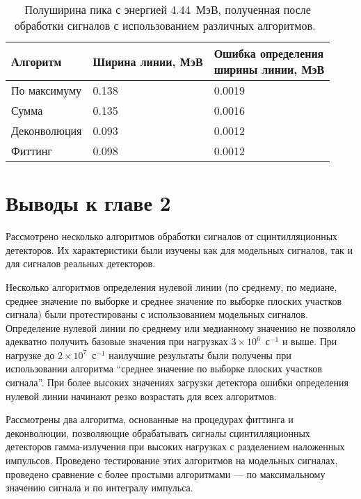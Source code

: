 \begin{table} [htbp]
    \centering
    \begin{threeparttable}
      \caption{ Полуширина пика с энергией 4.44~МэВ, полученная после обработки сигналов с использованием различных алгоритмов.~\cite{Khilkevitch2020} }
        \label{tab:processingCycloSignal}
        \begin{tabular}{| p{4cm} | p{5.5cm} | p{5.5cm} | }
            \hline
            Алгоритм   & Ширина линии, МэВ & \makecell{ Ошибка определения \\ ширины линии, МэВ } \\
            \hline
            По максимуму & 0.138 & 0.0019 \\
            Сумма &	0.135 &	0.0016\\
          Деконволюция &	0.093 &	0.0012 \\
          Фиттинг &	0.098 &	0.0012 \\
            \hline
        \end{tabular}
    \end{threeparttable}
\end{table}


\FloatBarrier
\section{Выводы к главе 2}

Рассмотрено несколько алгоритмов обработки сигналов от сцинтилляционных детекторов. Их характеристики были изучены как для модельных сигналов, так и для сигналов реальных детекторов.

Несколько алгоритмов определения нулевой линии (по среднему, по медиане, среднее значение по выборке и среднее значение по выборке плоских участков сигнала) были протестированы с использованием модельных сигналов. Определение нулевой линии по среднему или медианному значению не позволяло адекватно получить базовые значения при нагрузках $3 \times 10^6$~с${}^{-1}$ и выше. При нагрузке до $2 \times 10^7$~с${}^{-1}$ наилучшие результаты были получены при использовании алгоритма ``среднее значение по выборке плоских участков сигнала''. При более высоких значениях загрузки детектора ошибки определения нулевой линии начинают резко возрастать для всех алгоритмов.

Рассмотрены два алгоритма, основанные на процедурах фиттинга и деконволюции, позволяющие обрабатывать сигналы сцинтилляционных детекторов гамма-излучения при высоких нагрузках с разделением наложенных импульсов. Проведено тестирование этих алгоритмов на модельных сигналах, проведено сравнение с более простыми алгоритмами --- по максимальному значению сигнала и по интегралу импульса.

